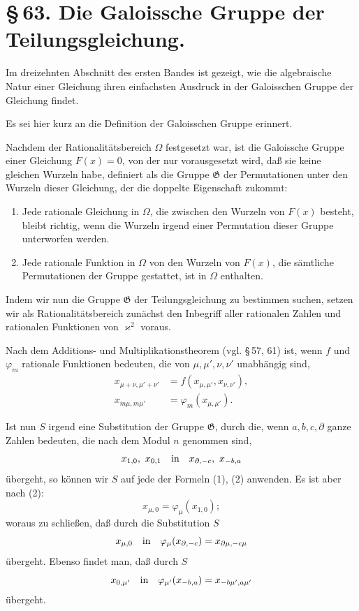 \documentclass[11pt]{article}
\begin{document}
\section*{\S\,63. Die Galoissche Gruppe der Teilungsgleichung.}

Im dreizehnten Abschnitt des ersten Bandes ist gezeigt, wie die algebraische Natur einer
Gleichung ihren einfachsten Ausdruck in der Galoisschen Gruppe der Gleichung findet.

Es sei hier kurz an die Definition der Galoisschen Gruppe erinnert.

Nachdem der Rationalitätsbereich $\Omega$ festgesetzt war, ist die Galoissche Gruppe einer
Gleichung $F(x)=0$, von der nur vorausgesetzt wird, daß sie keine gleichen Wurzeln habe,
definiert als die Gruppe $\mathfrak G$ der Permutationen unter den Wurzeln dieser Gleichung,
der die doppelte Eigenschaft zukommt:
\begin{enumerate}[label=\alph*)]
\item Jede rationale Gleichung in $\Omega$, die zwischen den Wurzeln von $F(x)$ besteht,
bleibt richtig, wenn die Wurzeln irgend einer Permutation dieser Gruppe unterworfen werden.
\item Jede rationale Funktion in $\Omega$ von den Wurzeln von $F(x)$, die sämtliche
Permutationen der Gruppe gestattet, ist in $\Omega$ enthalten.
\end{enumerate}

Indem wir nun die Gruppe $\mathfrak G$ der Teilungsgleichung zu bestimmen suchen, setzen
wir als Rationalitätsbereich zunächst den Inbegriff aller rationalen Zahlen und rationalen
Funktionen von $\varkappa^2$ voraus.

Nach dem Additions- und Multiplikationstheorem (vgl. \S\,57, 61) ist, wenn $f$ und
$\varphi_m$ rationale Funktionen bedeuten, die von $\mu,\mu',\nu,\nu'$ unabhängig sind,
\begin{align}
 x_{\mu+\nu,\mu'+\nu'}&=f(x_{\mu,\mu'},x_{\nu,\nu'}),\tag{1}\\
 x_{m\mu,m\mu'}&=\varphi_m(x_{\mu,\mu'}).\tag{2}
\end{align}

Ist nun $S$ irgend eine Substitution der Gruppe $\mathfrak G$, durch die, wenn
$a,b,c,\partial$ ganze Zahlen bedeuten, die nach dem Modul $n$ genommen sind,
\[
 x_{1,0},\ x_{0,1}\quad\hbox{in}\quad x_{\partial,-c},\ x_{-b,a}
\]
übergeht, so können wir $S$ auf jede der Formeln (1), (2) anwenden. Es ist aber nach (2):
\[
 x_{\mu,0}=\varphi_\mu(x_{1,0});
\]
woraus zu schließen, daß durch die Substitution $S$
\[
 x_{\mu,0}\quad\hbox{in}\quad \varphi_\mu(x_{\partial,-c})=x_{\partial\mu,-c\mu}
\]
übergeht. Ebenso findet man, daß durch $S$
\[
 x_{0,\mu'}\quad\hbox{in}\quad \varphi_{\mu'}(x_{-b,a})=x_{-b\mu',a\mu'}
\]
übergeht.
\end{document}
